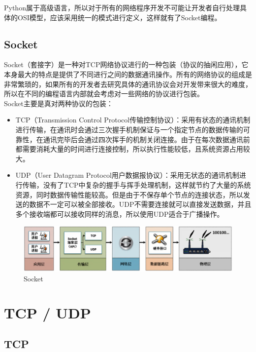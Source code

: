 Python属于高级语言，所以对于所有的网络程序开发不可能让开发者自行处理具体的OSI模型，应该采用统一的模式进行定义，这样就有了Socket编程。\\

\subsection{Socket}

Socket（套接字）是一种对TCP网络协议进行的一种包装（协议的抽闲应用），它本身最大的特点是提供了不同进行之间的数据通讯操作。所有的网络协议的组成是非常繁琐的，如果所有的开发者去研究具体的通讯协议会对开发带来很大的难度，所以在不同的编程语言内部就会考虑对一些网络的协议进行包装。\\

Socket主要是真对两种协议的包装：

\begin{itemize}
	\item TCP（Transmission Control Protocol传输控制协议）：采用有状态的通讯机制进行传输，在通讯时会通过三次握手机制保证与一个指定节点的数据传输的可靠性，在通讯完毕后会通过四次挥手的机制关闭连接。由于在每次数据通讯前都需要消耗大量的时间进行连接控制，所以执行性能较低，且系统资源占用较大。

	\item UDP（User Datagram Protocol用户数据报协议）：采用无状态的通讯机制进行传输，没有了TCP中复杂的握手与挥手处理机制，这样就节约了大量的系统资源，同时数据传输性能较高。但是由于不保存单个节点的连接状态，所以发送的数据不一定可以被全部接收。UDP不需要连接就可以直接发送数据，并且多个接收端都可以接收同样的消息，所以使用UDP适合于广播操作。
\end{itemize}

\begin{figure}[H]
	\centering
	\includegraphics[]{img/C12/12-1/4.png}
	\caption{Socket}
\end{figure}

\newpage

\section{TCP / UDP}

\subsection{TCP}

